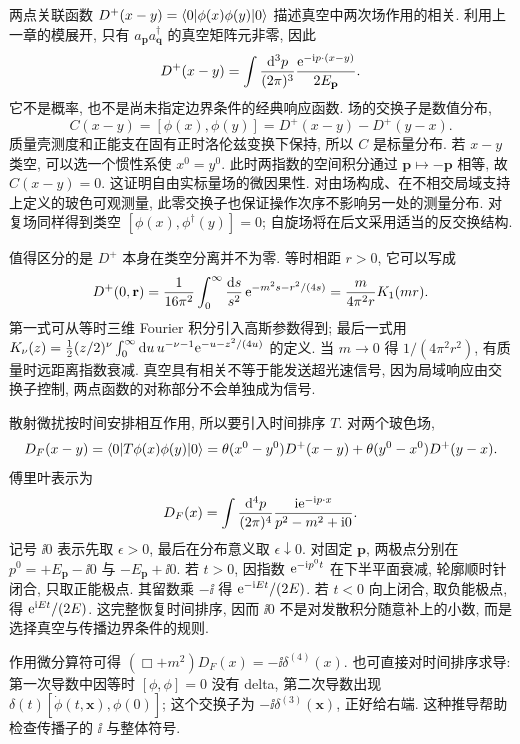\label{ch:propagators}
两点关联函数 $D^+(x-y)=\langle 0\rvert\phi(x)\phi(y)\lvert 0\rangle$ 描述真空中两次场作用的相关. 利用上一章的模展开, 只有 $a_{\mathbf p}a^\dagger_{\mathbf q}$ 的真空矩阵元非零, 因此
\begin{equation}\label{eq:wightman}
D^+(x-y)=\int\frac{\mathrm d^3p}{(2\pi)^3}\frac{\mathrm e^{-\mathrm i p\cdot(x-y)}}{2E_{\mathbf p}}.
\end{equation}
它不是概率, 也不是尚未指定边界条件的经典响应函数. 场的交换子是数值分布,
\[
C(x-y)=[\phi(x),\phi(y)]=D^+(x-y)-D^+(y-x).
\]
质量壳测度和正能支在固有正时洛伦兹变换下保持, 所以 $C$ 是标量分布. 若 $x-y$ 类空, 可以选一个惯性系使 $x^0=y^0$. 此时两指数的空间积分通过 $\mathbf p\mapsto-\mathbf p$ 相等, 故 $C(x-y)=0$. 这证明自由实标量场的微因果性. 对由场构成、在不相交局域支持上定义的玻色可观测量, 此零交换子也保证操作次序不影响另一处的测量分布. 对复场同样得到类空 $[\phi(x),\phi^\dagger(y)]=0$; 自旋场将在后文采用适当的反交换结构.

值得区分的是 $D^+$ 本身在类空分离并不为零. 等时相距 $r>0$, 它可以写成
\[
D^+(0,\mathbf r)=\frac1{16\pi^2}\int_0^\infty\frac{\mathrm ds}{s^2}\,
\mathrm e^{-m^2s-r^2/(4s)}=\frac m{4\pi^2r}K_1(mr).
\]
第一式可从等时三维 Fourier 积分引入高斯参数得到; 最后一式用 $K_\nu(z)=\frac12(z/2)^\nu\int_0^\infty \mathrm du\,u^{-\nu-1}\mathrm e^{-u-z^2/(4u)}$ 的定义. 当 $m\to0$ 得 $1/(4\pi^2r^2)$, 有质量时远距离指数衰减. 真空具有相关不等于能发送超光速信号, 因为局域响应由交换子控制, 两点函数的对称部分不会单独成为信号.

散射微扰按时间安排相互作用, 所以要引入时间排序 $T$. 对两个玻色场,
\[
D_F(x-y)=\langle 0\rvert T\phi(x)\phi(y)\lvert 0\rangle
=\theta(x^0-y^0)D^+(x-y)+\theta(y^0-x^0)D^+(y-x).
\]
傅里叶表示为
\begin{equation}\label{eq:feynman-scalar}
D_F(x)=\int\frac{\mathrm d^4p}{(2\pi)^4}\frac{\mathrm i\mathrm e^{-\mathrm i p\cdot x}}{p^2-m^2+\mathrm i0}.
\end{equation}
记号 $\ii0$ 表示先取 $\epsilon>0$, 最后在分布意义取 $\epsilon\downarrow0$. 对固定 $\mathbf p$, 两极点分别在 $p^0=+E_{\mathbf p}-\ii0$ 与 $-E_{\mathbf p}+\ii0$. 若 $t>0$, 因指数 $\mathrm e^{-\mathrm i p^0t}$ 在下半平面衰减, 轮廓顺时针闭合, 只取正能极点. 其留数乘 $-\ii$ 得 $\mathrm e^{-\mathrm i Et}/(2E)$. 若 $t<0$ 向上闭合, 取负能极点, 得 $\mathrm e^{\mathrm i Et}/(2E)$. 这完整恢复时间排序, 因而 $\ii0$ 不是对发散积分随意补上的小数, 而是选择真空与传播边界条件的规则.

作用微分算符可得 $(\Box+m^2)D_F(x)=-\ii\delta^{(4)}(x)$. 也可直接对时间排序求导: 第一次导数中因等时 $[\phi,\phi]=0$ 没有 delta, 第二次导数出现 $\delta(t)[\dot\phi(t,\mathbf x),\phi(0)]$; 这个交换子为 $-\ii\delta^{(3)}(\mathbf x)$, 正好给右端. 这种推导帮助检查传播子的 $\ii$ 与整体符号.

